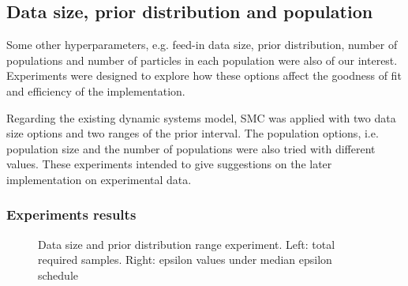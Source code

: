 \subsection{Data size, prior distribution and population}


Some other hyperparameters, e.g. feed-in data size, prior distribution, number of populations and number of particles in each population were also of our interest. Experiments were designed to explore how these options affect the goodness of fit and efficiency of the implementation.

Regarding the existing dynamic systems model, SMC was applied with two data size options and two ranges of the prior interval. The population options, i.e. population size and the number of populations were also tried with different values. These experiments intended to give suggestions on the later implementation on experimental data.

\subsubsection{Experiments results}

\begin{figure}[H]
    \begin{center}
    \end{center}

    \caption[Data size and prior distribution range experiment]%
    {Data size and prior distribution range experiment. Left: total required samples. Right: epsilon values under median epsilon schedule}
    \label{fig:size}

\end{figure}

